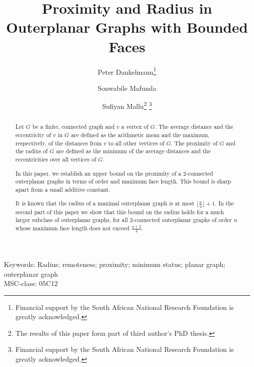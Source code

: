 \documentclass[a4paper,11pt]{article}
\numberwithin{equation}{theorem}
\begin{document}
\title{Proximity and Radius in Outerplanar Graphs with Bounded Faces}

\author[1]{Peter Dankelmann\thanks{Financial support by the South African National Research Foundation is greatly acknowledged.}}
\author[1,2]{Sonwabile Mafunda}
\author[1]{Sufiyan Mallu\thanks{The results of this paper form part of third author's PhD thesis.}
\thanks{Financial support by the South African National Research Foundation is greatly acknowledged.}}

\maketitle






\begin{abstract}
Let $G$ be a finite, connected graph and $v$ a vertex of $G$. 
The average distance and the eccentricity of $v$ in $G$ are defined as the arithmetic 
mean and the maximum, respectively, of the distances from $v$ to all other vertices of $G$. 
The proximity of $G$ and the radius of $G$ are defined as the minimum of the average 
distances and the eccentricities over all vertices of $G$. 

In this paper, we establish an upper bound on the proximity of a $2$-connected outerplanar graphs 
in terms of order and maximum face length. This bound is sharp apart from a small additive constant.  

It is known that the radius of a maximal outerplanar graph is at most $\lfloor \frac{n}{4} \rfloor +1$.  In the second part of this paper we show that this bound on the radius holds for a much 
larger subclass of outerplanar graphs, for all  
$2$-connected outerplanar graphs of order $n$ whose maximum face length does not exceed 
$\frac{n+2}{4}$.
\end{abstract}
Keywords: Radius; remoteness; proximity; minimum status; planar graph; outerplanar graph\\[5mm]
MSC-class: 05C12
\end{document}
